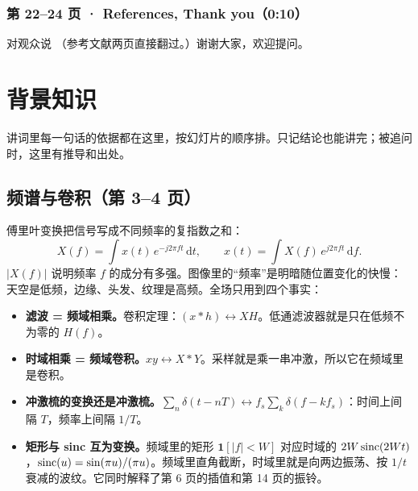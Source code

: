 \subsubsection*{第 22--24 页 · References, Thank you（0:10）}
\begin{exampleblock}{对观众说}
（参考文献两页直接翻过。）谢谢大家，欢迎提问。
\end{exampleblock}

\section{背景知识}\label{sec:bg}

讲词里每一句话的依据都在这里，按幻灯片的顺序排。只记结论也能讲完；被追问时，这里有推导和出处。

\subsection{频谱与卷积（第 3--4 页）}\label{sec:fourier}
傅里叶变换把信号写成不同频率的复指数之和：
\[
X(f)=\int x(t)\,e^{-j2\pi ft}\,\mathrm dt,\qquad x(t)=\int X(f)\,e^{j2\pi ft}\,\mathrm df .
\]
$|X(f)|$ 说明频率 $f$ 的成分有多强。图像里的“频率”是明暗随位置变化的快慢：天空是低频，边缘、头发、纹理是高频。全场只用到四个事实：
\begin{itemize}
  \item \textbf{滤波 = 频域相乘。}卷积定理：$(x*h)\leftrightarrow XH$。低通滤波器就是只在低频不为零的 $H(f)$。
  \item \textbf{时域相乘 = 频域卷积。}$xy\leftrightarrow X*Y$。采样就是乘一串冲激，所以它在频域里是卷积。
  \item \textbf{冲激梳的变换还是冲激梳。}$\sum_n\delta(t-nT)\leftrightarrow f_s\sum_k\delta(f-kf_s)$：时间上间隔 $T$，频率上间隔 $1/T$。
  \item \textbf{矩形与 sinc 互为变换。}频域里的矩形 $\mathbf 1[|f|<W]$ 对应时域的 $2W\operatorname{sinc}(2Wt)$，$\operatorname{sinc}(u)=\sin(\pi u)/(\pi u)$。频域里直角截断，时域里就是向两边振荡、按 $1/t$ 衰减的波纹。它同时解释了第 6 页的插值和第 14 页的振铃。
\end{itemize}

